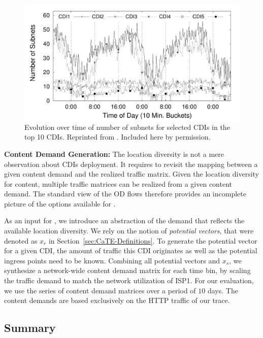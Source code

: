 \begin{figure}[tbp]
\center
\includegraphics[width=1\linewidth]{figures-pdf/SubnetChoice_r-2}
\caption{Evolution over time of number of subnets for selected CDIs in
  the top 10 CDIs. Reprinted from \cite{Cate-CCR}. Included here by permission.}
\label{fig:TemporalEffect}
\vspace{-1.5em}
\end{figure}



\noindent\textbf{Content Demand Generation:}\label{sec:TM}
The location diversity is not a mere observation about CDIs deployment. It
requires to revisit the mapping between a given content demand and the realized
traffic matrix. Given the location diversity for content, multiple traffic
matrices can be realized from a given content demand. The standard view of the
OD flows therefore provides an incomplete picture of the options available for
\cate.

As an input for \cate, we introduce an abstraction of the demand that reflects
the available location diversity.  We rely on the notion of \emph{potential
  vectors}, that were denoted as $x_{r}$ in Section~\ref{sec:CaTE-Definitions}.
To generate the potential vector for a given CDI, the amount of traffic this CDI
originates as well as the potential ingress points need to be known. Combining
all potential vectors and $x_{s}$, we synthesize a network-wide content demand
matrix for each time bin, by scaling the traffic demand to match the network
utilization of ISP1.  For our evaluation, we use the series of content demand
matrices over a period of $10$ days. The content demands are based exclusively
on the HTTP traffic of our trace.


\subsection{Summary}

